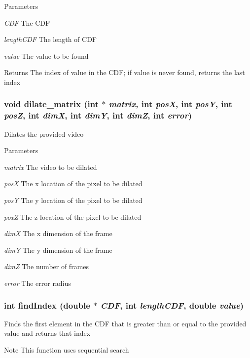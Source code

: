\begin{DoxyParams}{Parameters}
\item[{\em CDF}]The CDF \item[{\em lengthCDF}]The length of CDF \item[{\em value}]The value to be found \end{DoxyParams}
\begin{DoxyReturn}{Returns}
The index of value in the CDF; if value is never found, returns the last index 
\end{DoxyReturn}
\hypertarget{ex__particle__CUDA__naive__full_8cu_af2a0216d5b584632a6508d5ad918734e}{
\subsubsection[{dilate\_\-matrix}]{\setlength{\rightskip}{0pt plus 5cm}void dilate\_\-matrix (int $\ast$ {\em matrix}, \/  int {\em posX}, \/  int {\em posY}, \/  int {\em posZ}, \/  int {\em dimX}, \/  int {\em dimY}, \/  int {\em dimZ}, \/  int {\em error})}}
\label{ex__particle__CUDA__naive__full_8cu_af2a0216d5b584632a6508d5ad918734e}
Dilates the provided video 
\begin{DoxyParams}{Parameters}
\item[{\em matrix}]The video to be dilated \item[{\em posX}]The x location of the pixel to be dilated \item[{\em posY}]The y location of the pixel to be dilated \item[{\em poxZ}]The z location of the pixel to be dilated \item[{\em dimX}]The x dimension of the frame \item[{\em dimY}]The y dimension of the frame \item[{\em dimZ}]The number of frames \item[{\em error}]The error radius \end{DoxyParams}
\hypertarget{ex__particle__CUDA__naive__full_8cu_a71e946a9752dba5f8f3def41e58a8469}{
\subsubsection[{findIndex}]{\setlength{\rightskip}{0pt plus 5cm}int findIndex (double $\ast$ {\em CDF}, \/  int {\em lengthCDF}, \/  double {\em value})}}
\label{ex__particle__CUDA__naive__full_8cu_a71e946a9752dba5f8f3def41e58a8469}
Finds the first element in the CDF that is greater than or equal to the provided value and returns that index \begin{DoxyNote}{Note}
This function uses sequential search 
\end{DoxyNote}

